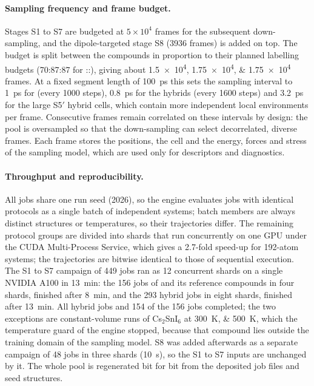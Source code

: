 \paragraph{Sampling frequency and frame budget.} Stages S1 to S7 are budgeted at $5\times10^4$ frames
for the subsequent down-sampling, and the dipole-targeted stage S8 (\num{3936} frames) is added on top.
The budget is split between the compounds in proportion to their planned labelling budgets
(70:87:87 for \CsSnI{}:\MASnI{}:\FASnI{}), giving about \numlist{1.5e4;1.75e4;1.75e4} frames. At a
fixed segment length of \SI{100}{\pico\second} this sets the sampling interval to \SI{1}{\pico\second}
for \CsSnI{} (every \num{1000} steps), \SI{0.8}{\pico\second} for the hybrids (every \num{1600} steps)
and \SI{3.2}{\pico\second} for the large S5$'$ hybrid cells, which contain more independent local
environments per frame. Consecutive frames remain correlated on these intervals by design: the pool
is oversampled so that the down-sampling can select decorrelated, diverse frames. Each frame stores
the positions, the cell and the energy, forces and stress of the sampling model, which are used only
for descriptors and diagnostics.

\paragraph{Throughput and reproducibility.} All jobs share one run seed (2026), so the engine evaluates
jobs with identical protocols as a single batch of independent systems; batch members are always
distinct structures or temperatures, so their trajectories differ. The remaining protocol groups are
divided into shards that run concurrently on one GPU under the CUDA Multi-Process Service, which gives
a 2.7-fold speed-up for 192-atom systems; the trajectories are bitwise identical to those of sequential
execution. The S1 to S7 campaign of 449 jobs ran as 12 concurrent shards on a single NVIDIA A100 in
\SI{13}{\minute}: the 156 jobs of \CsSnI{} and its reference compounds in four shards, finished after
\SI{8}{\minute}, and the 293 hybrid jobs in eight shards, finished after \SI{13}{\minute}. All hybrid
jobs and 154 of the 156 \CsSnI{} jobs completed; the two exceptions are constant-volume runs of
Cs$_2$SnI$_6$ at \SIlist{300;500}{\kelvin}, which the temperature guard of the engine stopped, because
that compound lies outside the training domain of the sampling model. S8 was added afterwards as a
separate campaign of 48 jobs in three shards (\SI{10}{\second}), so the S1 to S7 inputs are unchanged by
it. The whole pool is regenerated bit for bit from the deposited job files and seed structures.

